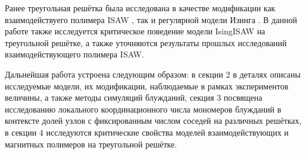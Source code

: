Ранее треугольная решётка была исследована в качестве модификации как взаимодействуего полимера ISAW \cite{Privman1986}, 
так и регулярной модели Изинга \cite{ShchurTriangle, selke2006critical}. 
В данной работе также исследуется критическое поведение модели IsingISAW на треугольной решётке, а также уточняются результаты прошлых исследований взаимодействующего полимера ISAW.

Дальнейшая работа устроена следующим образом:
в секции 2 в деталях описаны исследуемые модели, их модификации, наблюдаемые в рамках экспериментов величины, а также методы симуляций блужданий,
секция 3 посвящена исследованию локального координационного числа мономеров блужданий в контексте долей узлов с фиксированным числом соседей на различных решётках,
в секции 4 исследуются критические свойства моделей взаимодействующих и магнитных полимеров на треугольной решётке.
